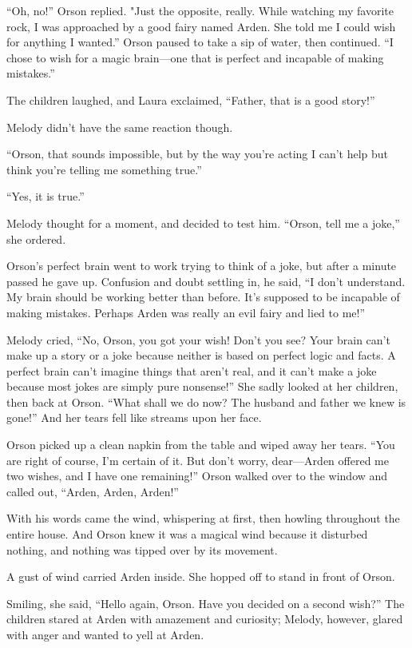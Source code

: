 “Oh, no!” Orson replied. "Just the opposite, really. While watching my favorite rock, I was approached by a good fairy named Arden. She told me I could wish for anything I wanted.” Orson paused to take a sip of water, then continued. “I chose to wish for a magic brain—one that is perfect and incapable of making mistakes.”

The children laughed, and Laura exclaimed, “Father, that is a good story!”

Melody didn't have the same reaction though.

“Orson, that sounds impossible, but by the way you're acting I can't help but think you're telling me something true.”

“Yes, it is true.”

Melody thought for a moment, and decided to test him. “Orson, tell me a joke,” she ordered.

Orson's perfect brain went to work trying to think of a joke, but after a minute passed he gave up. Confusion and doubt settling in, he said, “I don't understand. My brain should be working better than before. It's supposed to be incapable of making mistakes. Perhaps Arden was really an evil fairy and lied to me!”

Melody cried, “No, Orson, you got your wish! Don't you see? Your brain can't make up a story or a joke because neither is based on perfect logic and facts. A perfect brain can't imagine things that aren't real, and it can't make a joke because most jokes are simply pure nonsense!” She sadly looked at her children, then back at Orson. “What shall we do now? The husband and father we knew is gone!” And her tears fell like streams upon her face.

Orson picked up a clean napkin from the table and wiped away her tears. “You are right of course, I'm certain of it. But don't worry, dear—Arden offered me two wishes, and I have one remaining!” Orson walked over to the window and called out, “Arden, Arden, Arden!”

With his words came the wind, whispering at first, then howling throughout the entire house. And Orson knew it was a magical wind because it disturbed nothing, and nothing was tipped over by its movement.

A gust of wind carried Arden inside. She hopped off to stand in front of Orson.

Smiling, she said, “Hello again, Orson. Have you decided on a second wish?” The children stared at Arden with amazement and curiosity; Melody, however, glared with anger and wanted to yell at Arden.

